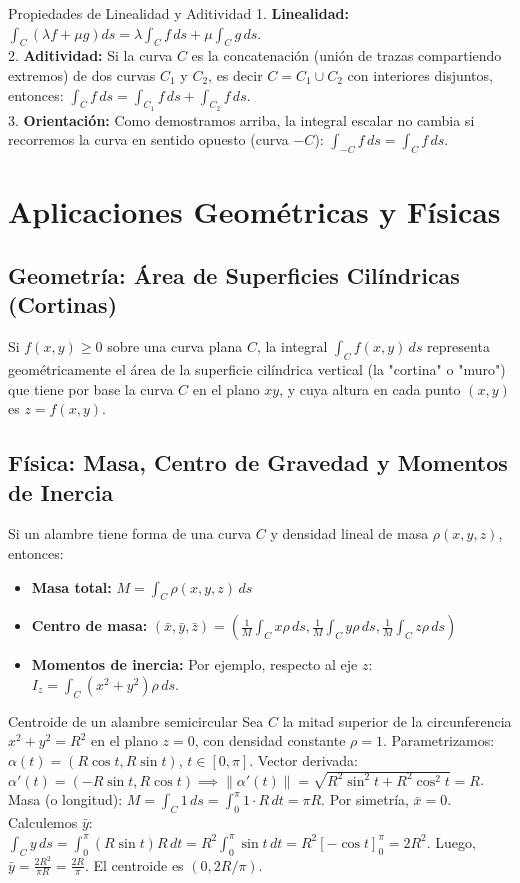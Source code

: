 \documentclass[11pt,a4paper]{article}
\begin{document}
\begin{observacionbox}{Propiedades de Linealidad y Aditividad}
1. \textbf{Linealidad:} $\int_C (\lambda f + \mu g) ds = \lambda \int_C f \, ds + \mu \int_C g \, ds$. \\
2. \textbf{Aditividad:} Si la curva $C$ es la concatenación (unión de trazas compartiendo extremos) de dos curvas $C_1$ y $C_2$, es decir $C = C_1 \cup C_2$ con interiores disjuntos, entonces:
$\int_C f \, ds = \int_{C_1} f \, ds + \int_{C_2} f \, ds$. \\
3. \textbf{Orientación:} Como demostramos arriba, la integral escalar no cambia si recorremos la curva en sentido opuesto (curva $-C$): $\int_{-C} f \, ds = \int_C f \, ds$.
\end{observacionbox}

\section{Aplicaciones Geométricas y Físicas}

\subsection{Geometría: Área de Superficies Cilíndricas (Cortinas)}
Si $f(x,y) \ge 0$ sobre una curva plana $C$, la integral $\int_C f(x,y) \, ds$ representa geométricamente el área de la superficie cilíndrica vertical (la "cortina" o "muro") que tiene por base la curva $C$ en el plano $xy$, y cuya altura en cada punto $(x,y)$ es $z = f(x,y)$.

\subsection{Física: Masa, Centro de Gravedad y Momentos de Inercia}
Si un alambre tiene forma de una curva $C$ y densidad lineal de masa $\rho(x,y,z)$, entonces:
\begin{itemize}
    \item \textbf{Masa total:} $M = \int_C \rho(x,y,z) \, ds$
    \item \textbf{Centro de masa:} $(\bar{x}, \bar{y}, \bar{z}) = \left( \frac{1}{M}\int_C x\rho \, ds, \frac{1}{M}\int_C y\rho \, ds, \frac{1}{M}\int_C z\rho \, ds \right)$
    \item \textbf{Momentos de inercia:} Por ejemplo, respecto al eje $z$: $I_z = \int_C (x^2+y^2)\rho \, ds$.
\end{itemize}

\begin{ejemplobox}{Centroide de un alambre semicircular}
Sea $C$ la mitad superior de la circunferencia $x^2+y^2=R^2$ en el plano $z=0$, con densidad constante $\rho=1$.
Parametrizamos: $\alpha(t) = (R\cos t, R\sin t)$, $t \in [0, \pi]$.
Vector derivada: $\alpha'(t) = (-R\sin t, R\cos t) \implies \|\alpha'(t)\| = \sqrt{R^2\sin^2 t + R^2\cos^2 t} = R$.
Masa (o longitud): $M = \int_C 1 \, ds = \int_0^\pi 1 \cdot R \, dt = \pi R$.
Por simetría, $\bar{x} = 0$. Calculemos $\bar{y}$:
$\int_C y \, ds = \int_0^\pi (R\sin t) R \, dt = R^2 \int_0^\pi \sin t \, dt = R^2 [-\cos t]_0^\pi = 2R^2$.
Luego, $\bar{y} = \frac{2R^2}{\pi R} = \frac{2R}{\pi}$. El centroide es $(0, 2R/\pi)$.
\end{ejemplobox}
\end{document}

